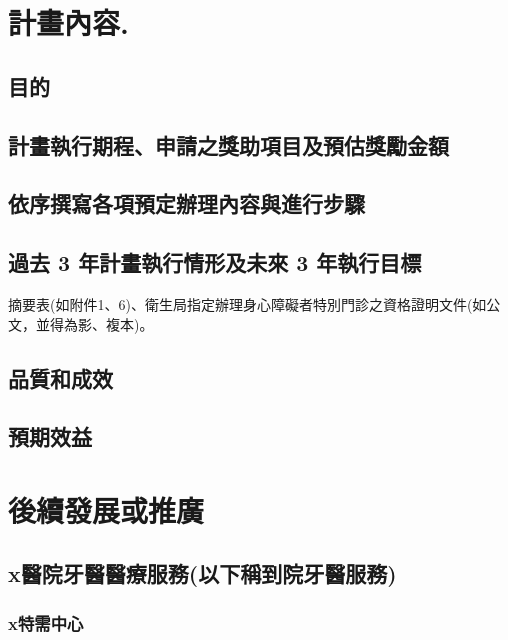\section*{計畫內容.}

\subsection*{目的}
\subsection*{計畫執行期程、申請之獎助項目及預估獎勵金額}
\subsection*{依序撰寫各項預定辦理內容與進行步驟}
\subsection*{過去 3 年計畫執行情形及未來 3 年執行目標}
摘要表(如附件1、6)、衛生局指定辦理身心障礙者特別門診之資格證明文件(如公文，並得為影、複本)。
\subsection*{品質和成效}
\subsection*{預期效益}


\section{後續發展或推廣}

\subsection{x醫院牙醫醫療服務(以下稱到院牙醫服務)}
\label{dent}

\subsubsection{x特需中心}

